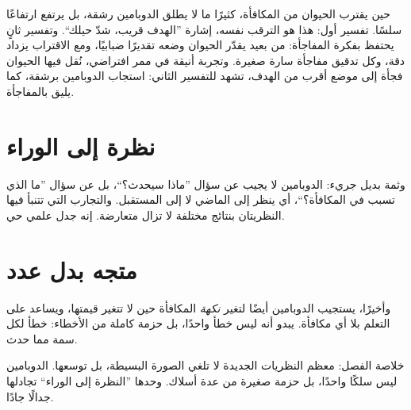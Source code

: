 حين يقترب الحيوان من المكافأة، كثيرًا ما لا يطلق الدوبامين رشقة، بل يرتفع ارتفاعًا سلسًا. تفسير أول: هذا هو الترقب نفسه، إشارة ”الهدف قريب، شدّ حيلك“. وتفسير ثانٍ يحتفظ بفكرة المفاجأة: من بعيد يقدّر الحيوان وضعه تقديرًا ضبابيًا، ومع الاقتراب يزداد دقة، وكل تدقيق مفاجأة سارة صغيرة. وتجربة أنيقة في ممر افتراضي، نُقل فيها الحيوان فجأة إلى موضع أقرب من الهدف، تشهد للتفسير الثاني: استجاب الدوبامين برشقة، كما يليق بالمفاجأة.

\section*{نظرة إلى الوراء}

وثمة بديل جريء: الدوبامين لا يجيب عن سؤال ”ماذا سيحدث؟“، بل عن سؤال ”ما الذي تسبب في المكافأة؟“، أي ينظر إلى الماضي لا إلى المستقبل. والتجارب التي تتنبأ فيها النظريتان بنتائج مختلفة لا تزال متعارضة. إنه جدل علمي حي.

\section*{متجه بدل عدد}

وأخيرًا، يستجيب الدوبامين أيضًا لتغير \emph{نكهة} المكافأة حين لا تتغير قيمتها، ويساعد على التعلم بلا أي مكافأة. يبدو أنه ليس خطأ واحدًا، بل حزمة كاملة من الأخطاء: خطأ لكل سمة مما حدث.

خلاصة الفصل: معظم النظريات الجديدة لا تلغي الصورة البسيطة، بل توسعها. الدوبامين ليس سلكًا واحدًا، بل حزمة صغيرة من عدة أسلاك. وحدها ”النظرة إلى الوراء“ تجادلها جدالًا جادًا.

